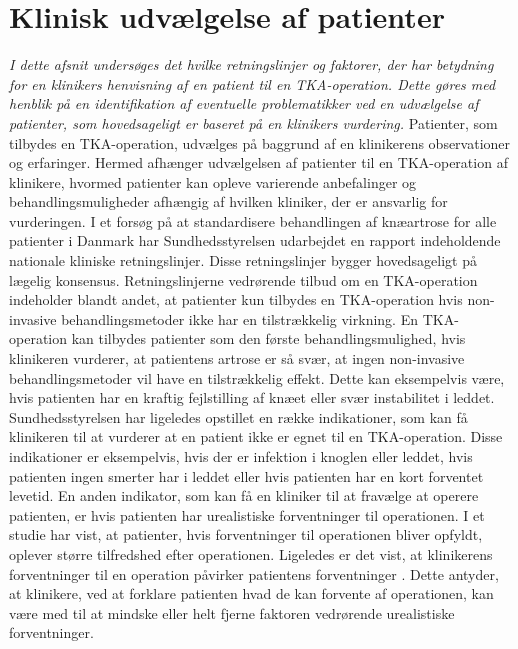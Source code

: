 \section{Klinisk udvælgelse af patienter}\label{kliniskudvaelgelse}
\textit{I dette afsnit undersøges det hvilke retningslinjer og faktorer, der har betydning for en klinikers henvisning af en patient til en TKA-operation. Dette gøres med henblik på en identifikation af eventuelle problematikker ved en udvælgelse af patienter, som hovedsageligt er baseret på en klinikers vurdering.}
Patienter, som tilbydes en TKA-operation, udvælges på baggrund af en klinikerens observationer og erfaringer. Hermed afhænger udvælgelsen af patienter til en TKA-operation af klinikere, hvormed patienter kan opleve varierende anbefalinger og behandlingsmuligheder afhængig af hvilken kliniker, der er ansvarlig for vurderingen. I et forsøg på at standardisere behandlingen af knæartrose for alle patienter i Danmark har Sundhedsstyrelsen udarbejdet en rapport indeholdende nationale kliniske retningslinjer. Disse retningslinjer bygger hovedsageligt på lægelig konsensus. Retningslinjerne vedrørende tilbud om en TKA-operation indeholder blandt andet, at patienter kun tilbydes en TKA-operation hvis non-invasive behandlingsmetoder ikke har en tilstrækkelig virkning. En TKA-operation kan tilbydes patienter som den første behandlingsmulighed, hvis klinikeren vurderer, at patientens artrose er så svær, at ingen non-invasive behandlingsmetoder vil have en tilstrækkelig effekt. Dette kan eksempelvis være, hvis patienten har en kraftig fejlstilling af knæet eller svær instabilitet i leddet. \citep{brostrom2012} \\
Sundhedsstyrelsen har ligeledes opstillet en række indikationer, som kan få klinikeren til at vurderer at en patient ikke er egnet til en TKA-operation. Disse indikationer er eksempelvis, hvis der er infektion i knoglen eller leddet, hvis patienten ingen smerter har i leddet eller hvis patienten har en kort forventet levetid. En anden indikator, som kan få en kliniker til at fravælge at operere patienten, er hvis patienten har urealistiske forventninger til operationen. \citep{brostrom2012} I et studie har  vist, at patienter, hvis forventninger til operationen bliver opfyldt, oplever større tilfredshed efter operationen. Ligeledes er det vist, at klinikerens forventninger til en operation påvirker patientens forventninger \citep{tejada2010}. Dette antyder, at klinikere, ved at forklare patienten hvad de kan forvente af operationen, kan være med til at mindske eller helt fjerne faktoren vedrørende urealistiske forventninger. \\
